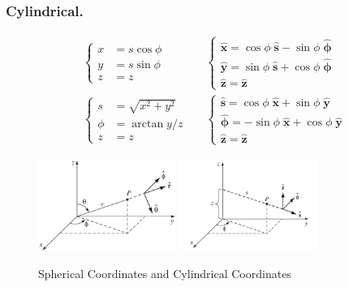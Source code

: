\documentclass[../main.tex]{subfiles}
\begin{document}
\subsubsection{Cylindrical.}
\begin{align*}
   & \begin{cases}
        x &= s \cos \phi \\
        y &= s \sin \phi \\
        z & =z
    \end{cases}&&
    \begin{cases}
        \mathbf{\hat{x}} =  \cos \phi \;\mathbf{\hat{s}}-  \sin \phi \;\boldsymbol{\hat{\phi}} \\
        \mathbf{\hat{y}} =  \sin \phi \;\mathbf{\hat{s}} + \cos \phi \;\boldsymbol{\hat{\phi}} \\
        \mathbf{\hat{z}} = \mathbf{\hat{z}} 
    \end{cases}\\
   &\begin{cases}
        s &= \sqrt{x^2 + y^2 }\\
        \phi &=\arctan y/z\\
        z & = z
    \end{cases}&&
    \begin{cases} 
        \mathbf{\hat{s}} =  \cos \phi \;\mathbf{\hat{x}} +  \sin \phi \;\boldsymbol{\hat{y}}\\
        \boldsymbol{\hat{\phi}} = -\sin  \phi \;\mathbf{\hat{x}} + \cos \phi \;\boldsymbol{\hat{y}} \\
        \boldsymbol{\hat{z}} = \boldsymbol{\hat{z}}
    \end{cases}
\end{align*}

\begin{figure}
    \centering
    \includegraphics[width=0.4\textwidth]{Spherical.png}
    \includegraphics[width=0.4\textwidth]{Cyl.png}
    \caption*{Spherical Coordinates and Cylindrical Coordinates}
\end{figure}
\end{document}
